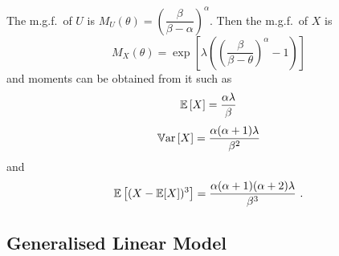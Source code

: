 The m.g.f.~of $U$ is $M_U(\theta) = \left(\dfrac{\beta}{\beta-\alpha}\right)^\alpha$. Then the m.g.f.~of $X$ is
\begin{equation}
  M_X(\theta)=\exp\left[\lambda\left(\left(\frac{\beta}{\beta-\theta}\right)^{\alpha}-1\right)\right]
\end{equation}
and moments can be obtained from it such as
\begin{equation}
  \operatorname{\mathbb{E}}\left[X\right]=\frac{\alpha\lambda}{\beta}
\end{equation}
\begin{equation}
  \operatorname{\mathbb{V}ar}\left[X\right]=\frac{\alpha(\alpha+1)\lambda}{\beta^2}
  \label{eq:compoundPoisson_variance}
\end{equation}
and
\begin{equation}
  \operatorname{\mathbb{E}}\left[(X-\operatorname{\mathbb{E}}[X])^3\right] = \frac{\alpha(\alpha+1)(\alpha+2)\lambda}{\beta^3}
  \ .
\end{equation}

\subsection{Generalised Linear Model}

